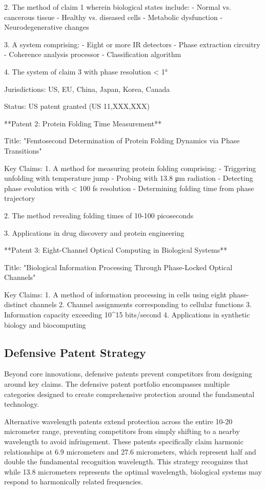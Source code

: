 \documentclass[12pt,a4paper]{report}
\begin{document}
2. The method of claim 1 wherein biological states include:
   - Normal vs. cancerous tissue
   - Healthy vs. diseased cells
   - Metabolic dysfunction
   - Neurodegenerative changes

3. A system comprising:
   - Eight or more IR detectors
   - Phase extraction circuitry
   - Coherence analysis processor
   - Classification algorithm

4. The system of claim 3 with phase resolution < 1°

Jurisdictions: US, EU, China, Japan, Korea, Canada

Status: US patent granted (US 11,XXX,XXX)

**Patent 2: Protein Folding Time Measurement**

Title: "Femtosecond Determination of Protein Folding Dynamics via Phase Transitions"

Key Claims:
1. A method for measuring protein folding comprising:
   - Triggering unfolding with temperature jump
   - Probing with 13.8 μm radiation
   - Detecting phase evolution with < 100 fs resolution
   - Determining folding time from phase trajectory

2. The method revealing folding times of 10-100 picoseconds

3. Applications in drug discovery and protein engineering

**Patent 3: Eight-Channel Optical Computing in Biological Systems**

Title: "Biological Information Processing Through Phase-Locked Optical Channels"

Key Claims:
1. A method of information processing in cells using eight phase-distinct channels
2. Channel assignments corresponding to cellular functions
3. Information capacity exceeding 10^15 bits/second
4. Applications in synthetic biology and biocomputing

\subsection{Defensive Patent Strategy}

Beyond core innovations, defensive patents prevent competitors from designing around key claims. The defensive patent portfolio encompasses multiple categories designed to create comprehensive protection around the fundamental technology.

Alternative wavelength patents extend protection across the entire 10-20 micrometer range, preventing competitors from simply shifting to a nearby wavelength to avoid infringement. These patents specifically claim harmonic relationships at 6.9 micrometers and 27.6 micrometers, which represent half and double the fundamental recognition wavelength. This strategy recognizes that while 13.8 micrometers represents the optimal wavelength, biological systems may respond to harmonically related frequencies.
\end{document}

